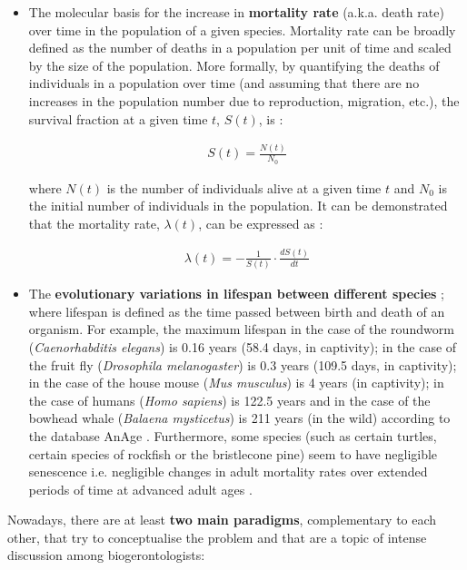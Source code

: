 \begin{itemize}
	
	\item The molecular basis for the increase in \textbf{mortality rate} (a.k.a. death rate) over time in the population of a given species. Mortality rate can be broadly defined as the number of deaths in a population per unit of time and scaled by the size of the population. More formally, by quantifying the deaths of individuals in a population over time (and assuming that there are no increases in the population number due to reproduction, migration, \acrshort{etc.}), the survival fraction at a given time $t$, $S(t)$, is \cite{Witten1986}:
	
	\begin{align} \label{eq:1.1}
	S(t) = \frac{N(t)}{N_0}
	\end{align}
	
	where $N(t)$ is the number of individuals alive at a given time $t$ and $N_0$ is the initial number of individuals in the population. It can be demonstrated that the mortality rate, $\lambda(t)$, can be expressed as \cite{Witten1986}:
	
	\begin{align} \label{eq:1.2}
	\lambda(t) = - \frac{1}{S(t)} \cdot \frac{dS(t)}{dt}
	\end{align}
	
	\item The \textbf{evolutionary variations in lifespan between different species} \cite{Jones2013}; where lifespan is defined as the time passed between birth and death of an organism. For example, the maximum lifespan in the case of the roundworm (\textit{Caenorhabditis elegans}) is 0.16 years (58.4 days, in captivity); in the case of the fruit fly (\textit{Drosophila melanogaster}) is 0.3 years (109.5 days, in captivity); in the case of the house mouse (\textit{Mus musculus}) is 4 years (in captivity); in the case of humans (\textit{Homo sapiens}) is 122.5 years and in the case of the bowhead whale (\textit{Balaena mysticetus}) is 211 years (in the wild) according to the database AnAge \cite{DEMAGALHAES2009}. Furthermore, some species (such as certain turtles, certain species of rockfish or the bristlecone pine) seem to have negligible senescence \acrshort{i.e.} negligible changes in adult mortality rates over extended periods of time at advanced adult ages \cite{Finch2009}.   
	
\end{itemize}

Nowadays, there are at least \textbf{two main paradigms}, complementary to each other, that try to conceptualise the problem and that are a topic of intense discussion among biogerontologists:

